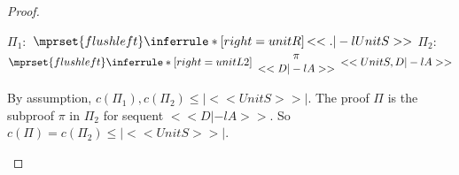 \begin{proof}
\begin{enumerate}
\begin{itemize}
      \begin{center}
        \scriptsize
        $\Pi_1:$
        \begin{math}
          $$\mprset{flushleft}
          \inferrule* [right={\tiny unitR}] {
            \,
          }{<<. |-l UnitS>>}
        \end{math}
        \qquad\qquad
        $\Pi_2:$
        \begin{math}
          $$\mprset{flushleft}
          \inferrule* [right={\tiny unitL2}] {
            {
              \begin{array}{c}
                \pi \\
                {<<D |-l A>>}
              \end{array}
            }
          }{<<UnitS, D |-l A>>}
        \end{math}
      \end{center}
      By assumption, $c(\Pi_1),c(\Pi_2)\leq |<<UnitS>>|$. The proof $\Pi$ is the subproof $\pi$
      in $\Pi_2$ for sequent $<<D |-l A>>$. So $c(\Pi)=c(\Pi_2)\leq |<<UnitS>>|$.


\end{itemize}
\end{enumerate}
\end{proof}
